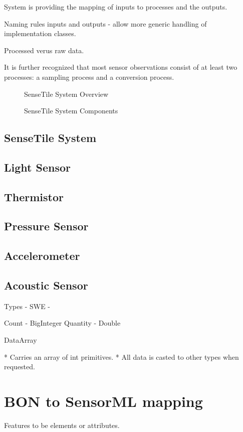 \documentclass[]{final_report}
\begin{document}
System is providing the mapping of inputs to processes and the outputs.

Naming rules inputs and outputs - allow more generic handling of implementation classes.

Processed verus raw data.

It is further recognized that most sensor observations consist of at least two processes: a sampling process and a conversion process.

 \begin{figure}
\caption{SenseTile System Overview}\label{fig:SenseTileSystem.pdf}
\end{figure}

 \begin{figure}
\caption{SenseTile System Components}\label{fig:SensorML_SenseTile_System_2_pa1.pdf}
\end{figure}

\subsection{SenseTile System}
\subsection{Light Sensor}
\subsection{Thermistor}
\subsection{Pressure Sensor}
\subsection{Accelerometer}
\subsection{Acoustic Sensor}

Types
 - SWE -

Count - BigInteger
Quantity - Double

DataArray

 * Carries an array of int primitives.
 * All data is casted to other types when requested.


\newpage
\section{BON to SensorML mapping}
Features to be elements or attributes.
\end{document}
